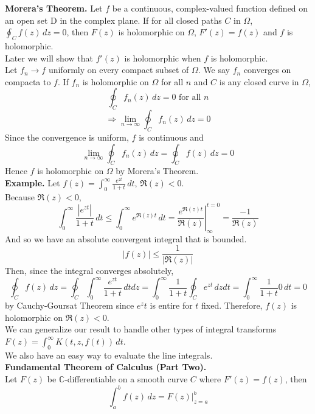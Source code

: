 \documentclass[11pt]{article}
\newcommand*\Eval[3]{\left.#1\right\rvert_{#2}^{#3}}
\begin{document}
\newline
\textbf{Morera's Theorem.} Let $f$ be a continuous, complex-valued function defined on an open set D in the complex plane. If for all closed paths $C$ in $\Omega$, $\oint_C f(z) \,dz = 0$, then $F(z)$ is holomorphic on $\Omega$, $F'(z) = f(z)$ and $f$ is holomorphic. \\
Later we will show that $f'(z)$ is holomorphic when $f$ is holomorphic. \\
\newline
Let $f_n \to f$ uniformly on every compact subset of $\Omega$. We say $f_n$ converges on compacta to $f$. If $f_n$ is holomorphic on $\Omega$ for all $n$ and $C$ is any closed curve in $\Omega$, 
\begin{equation*}
\oint_C f_n(z) \,dz = 0 \mbox{ for all } n
\end{equation*}
$$\Rightarrow \lim_{n\to \infty}{\oint_Cf_n(z) \, dz} = 0$$
Since the convergence is uniform, $f$ is continuous and 
$$ \lim_{n\to \infty}{\oint_C f_n(z) \,dz} = \oint_C f(z) \, dz = 0$$
Hence $f$ is holomorphic on $\Omega$ by Morera's Theorem. \\
\newline 
\textbf{Example.} Let $f(z) = \int_0^{\infty} \frac{e^{zt}}{1 + t} \, dt$, $\Re(z) < 0$. \\
Because $\Re(z) < 0$, 
$$\int_0^{\infty} \frac{|e^{zt}|}{1 + t} \,dt \leqslant \int_0^{\infty} e^{\Re(z)t} \,dt = \Eval{\frac{e^{\Re(z)t}}{\Re(z)}}{\infty}{t = 0} = \frac{-1}{\Re(z)}$$
And so we have an absolute convergent integral that is bounded. 
$$|f(z)| \leqslant \frac{1}{|\Re(z)|}$$
Then, since the integral converges absolutely,
$$\oint_C f(z) \,dz = \oint_C \int_0^{\infty} \frac{e^{zt}}{1 + t}\,dtdz = \int_0^{\infty} \frac{1}{1+t} \oint_C e^{zt} \,dzdt = \int_0^{\infty} \frac{1}{1+t}0 \,dt = 0$$
by Cauchy-Goursat Theorem since $e^zt$ is entire for $t$ fixed. Therefore, $f(z)$ is holomorphic on $\Re(z) < 0$. \\
\newline 
We can generalize our result to handle other types of integral transforms $F(z) = \int_0^{\infty} K(t, z, f(t)) \,dt$. \\
We also have an easy way to evaluate the line integrals. \\
\newline
\textbf{Fundamental Theorem of Calculus (Part Two).} \\
Let $F(z)$ be $\mathbb{C}$-differentiable on a smooth curve $C$ where $F'(z) = f(z)$, then
$$\int_a^b f(z) \,dz = F(z)\Big|_{z = a}^{b}$$
\end{document}
